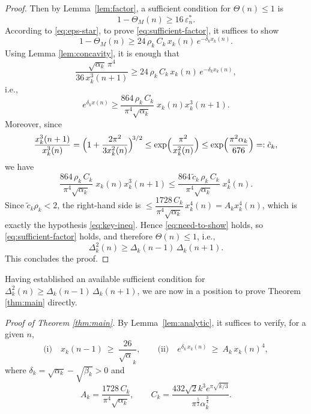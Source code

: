 \documentclass[12pt]{article}
\numberwithin{equation}{section}
\begin{document}
\begin{proof}
Then by Lemma~\ref{lem:factor}, a sufficient condition for
\(
\Theta(n)\le 1
\)
is
\begin{equation}\label{eq:sufficient-factor}
1-\Theta_M(n) \ge 16\,\varepsilon_n^\ast.
\end{equation}
According to \eqref{eq:eps-star}, to prove \eqref{eq:sufficient-factor}, it suffices to show
\begin{equation}\label{eq:need-to-show}
1-\Theta_M(n) \ge 24\,\rho_k\,C_k\, x_k(n)\, e^{-\delta_k x_k(n)}.
\end{equation}
Using Lemma \ref{lem:concavity}, it is enough that
\[
\frac{\sqrt{\alpha_k}\,\pi^4}{36\,x_k^3(n+1)} \ge 24\,\rho_k\,C_k\, x_k(n)\, e^{-\delta_k x_k(n)},
\]
i.e.,
\[
e^{\delta_k x(n)}\ge \frac{864\,\rho_k\,C_k}{\pi^4\sqrt{\alpha_k}}\;x_k(n)x_k^3(n+1).
\]
Moreover, since
\[
\frac{x_k^3(n+1)}{x_k^3(n)}
=\Bigl(1+\frac{2\pi^2}{3x_k^2(n)}\Bigr)^{\!3/2}
\le \exp\Bigl(\frac{\pi^2}{x_k^2(n)}\Bigr)
\le \exp\Bigl(\frac{\pi^2\alpha_k}{676}\Bigr)=:\tilde{c}_k,
\]
we have
\[
\frac{864\,\rho_k\,C_k}{\pi^4\sqrt{\alpha_k}}\;x_k(n)x_k^3(n+1) \le \frac{864\,\tilde{c}_k\,\rho_k\,C_k}{\pi^4\sqrt{\alpha_k}}\;x_k^4(n).
\]
Since \(\tilde{c}_k\rho_k<2\), the right-hand side is $\le \dfrac{1728\,C_k}{\pi^4\sqrt{\alpha_k}}\,x_k^4(n)=A_k x_k^4(n)$, which is exactly the hypothesis \eqref{eq:key-ineq}. Hence \eqref{eq:need-to-show} holds, so \eqref{eq:sufficient-factor} holds, and therefore \(\Theta(n)\le 1\), i.e.,
\[
\Delta_k^2(n) \ge \Delta_k(n-1)\,\Delta_k(n+1).
\]
This concludes the proof.
\end{proof}

Having established an available sufficient condition for $\Delta_k^2(n) \ge \Delta_k(n-1)\,\Delta_k(n+1)$, we are now in a position to prove Theorem \ref{thm:main} directly.

{\noindent\it Proof of Theorem \ref{thm:main}.}
By Lemma~\ref{lem:analytic}, it suffices to verify, for a given $n$,
\begin{equation}\label{eq:two-hyps}
\text{(i)}\quad x_k(n-1)\ \ge\ \frac{26}{\sqrt\alpha_k},
\qquad
\text{(ii)}\quad e^{\delta_k\,x_k(n)}\ \ge\ A_k\,x_k(n)^4,
\end{equation}
where $\delta_k=\sqrt{\alpha_k}-\sqrt{\beta_k}>0$ and
\[
A_k=\frac{1728\,C_k}{\pi^4\sqrt{\alpha_k}},
\qquad
C_k=\frac{432\sqrt{2}k^3 e^{\pi\sqrt{k/3}}}{\pi^{\frac{5}{2}}\alpha_k^{\frac{3}{4}}}.
\]
\end{document}
